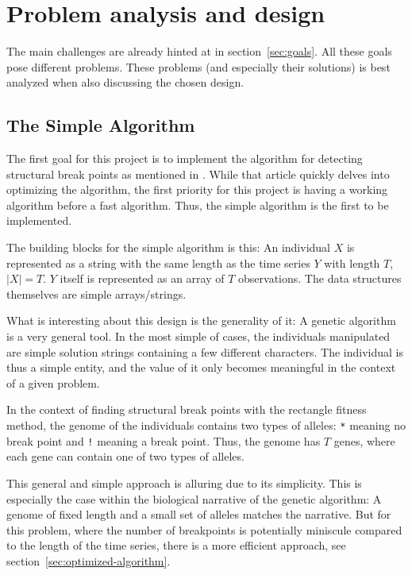 
\section{Problem analysis and design} \label{sec:analysis-design} 

The main challenges are already hinted at in section~\ref{sec:goals}. All these
goals pose different problems. These problems (and especially their solutions)
is best analyzed when also discussing the chosen design.


\subsection{The Simple Algorithm} \label{sec:simple-algorithm} 

The first goal for this project is to implement the algorithm for detecting
structural break points as mentioned in \cite{doerr2017a}. While that article
quickly delves into optimizing the algorithm, the first priority for this
project is having a working algorithm before a fast algorithm. Thus, the simple
algorithm is the first to be implemented. 

The building blocks for the simple algorithm is this: An individual $X$
is represented as a string with the same length as the time series $Y$ with
length $T$, $|X| = T$. $Y$ itself is represented as an array of $T$
observations. The data structures themselves are simple arrays/strings. 

What is interesting about this design is the generality of it: A
genetic algorithm is a very general tool. In the most simple of cases, the
individuals manipulated are simple solution strings containing a few different 
characters. The individual is thus a simple entity, and the value
of it only becomes meaningful in the context of a given problem.

In the context of finding structural break points with the rectangle fitness
method, the genome of the individuals contains two types of alleles: \texttt{*}
meaning no break point and \texttt{!} meaning a break point. Thus, the genome
has $T$ genes, where each gene can contain one of two types of alleles. 

This general and simple approach is alluring due to its simplicity. This is
especially the case within the biological narrative of the genetic algorithm: A
genome of fixed length and a small set of alleles matches the narrative. But for
this problem, where the number of breakpoints is potentially miniscule compared
to the length of the time series, there is a more efficient approach, see
section~\ref{sec:optimized-algorithm}. 


